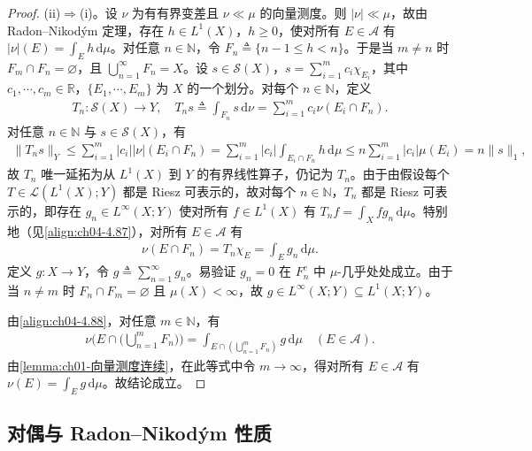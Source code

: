 \documentclass[../../main.tex]{subfiles}%
\begin{document}
\begin{proof}
(ii)$\Rightarrow$(i)。设 $\nu$ 为有有界变差且 $\nu\ll\mu$ 的向量测度。则 $|\nu|\ll\mu$，故由 Radon--Nikodým 定理，存在 $h\in L^1(X)$，$h\geqslant0$，使对所有 $E\in\mathcal{A}$ 有 $|\nu|(E)=\int_E h\,\mathrm{d}\mu$。对任意 $n\in\mathbb{N}$，令 $F_n\triangleq \{n-1\leqslant h<n\}$。于是当 $m\neq n$ 时 $F_m\cap F_n=\varnothing $，且 $\bigcup_{n=1}^\infty F_n=X$。设 $s\in\mathcal{S}(X)$，$s=\sum_{i=1}^m c_i\chi_{E_i}$，其中 $c_1,\cdots ,c_m\in\mathbb{R}$，$\{E_1,\cdots ,E_m\}$ 为 $X$ 的一个划分。对每个 $n\in\mathbb{N}$，定义
\begin{align}
T_n:\mathcal{S}(X)\to Y,\quad T_ns\triangleq \int_{F_n}s\,\mathrm{d}\nu=\sum_{i=1}^m c_i\nu(E_i\cap F_n). \label{align:ch04-4.87}
\end{align}
对任意 $n\in\mathbb{N}$ 与 $s\in\mathcal{S}(X)$，有
\begin{align*}
\|T_ns\|_Y\leqslant\sum_{i=1}^m|c_i||\nu|(E_i\cap F_n)=\sum_{i=1}^m|c_i|\int_{E_i\cap F_n}h\,\mathrm{d}\mu\leqslant n\sum_{i=1}^m|c_i|\mu(E_i)=n\|s\|_1,
\end{align*}
故 $T_n$ 唯一延拓为从 $L^1(X)$ 到 $Y$ 的有界线性算子，仍记为 $T_n$。由于由假设每个 $T\in\mathcal{L}(L^1(X);Y)$ 都是 Riesz 可表示的，故对每个 $n\in\mathbb{N}$，$T_n$ 都是 Riesz 可表示的，即存在 $g_n\in L^\infty(X;Y)$ 使对所有 $f\in L^1(X)$ 有 $T_nf=\int_X fg_n\,\mathrm{d}\mu$。特别地（见\eqref{align:ch04-4.87}），对所有 $E\in\mathcal{A}$ 有
\begin{align}
\nu(E\cap F_n)=T_n\chi_E=\int_E g_n\,\mathrm{d}\mu. \label{align:ch04-4.88}
\end{align}
定义 $g:X\to Y$，令 $g\triangleq \sum_{n=1}^\infty g_n$。易验证 $g_n=0$ 在 $F_n^c$ 中 $\mu$-几乎处处成立。由于当 $n\neq m$ 时 $F_n\cap F_m=\varnothing $ 且 $\mu(X)<\infty$，故 $g\in L^\infty(X;Y)\subseteq L^1(X;Y)$。

由\eqref{align:ch04-4.88}，对任意 $m\in\mathbb{N}$，有
\begin{align*}
\nu\Big(E\cap\Big(\bigcup_{n=1}^m F_n\Big)\Big)=\int_{E\cap(\bigcup_{n=1}^m F_n)}g\,\mathrm{d}\mu\quad(E\in\mathcal{A}).
\end{align*}
由\cref{lemma:ch01-向量测度连续}，在此等式中令 $m\to\infty$，得对所有 $E\in\mathcal{A}$ 有 $\nu(E)=\int_E g\,\mathrm{d}\mu$。故结论成立。
\end{proof}

\subsection{对偶与 Radon--Nikodým 性质}\label{subsection:ch04-对偶RNP}
\end{document}
